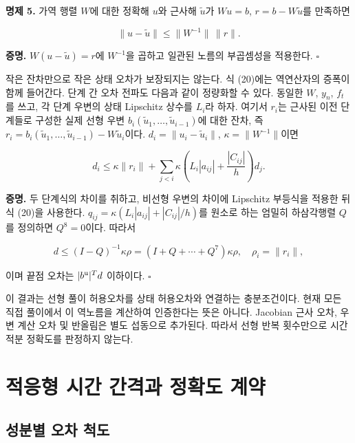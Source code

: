 \documentclass[
  10pt,
  dvipsnames]{article}
\begin{document}
\textbf{명제 5.} 가역 행렬 \(W\)에 대한 정확해 \(u\)와 근사해
\(\widetilde u\)가 \(Wu=b\), \(r=b-W\widetilde u\)를 만족하면

\[
 \|u-\widetilde u\|\le\|W^{-1}\|\,\|r\|.
 \tag{20}
\]

\textbf{증명.} \(W(u-\widetilde u)=r\)에 \(W^{-1}\)을 곱하고 일관된
노름의 부곱셈성을 적용한다. \(\square\)

작은 잔차만으로 작은 상태 오차가 보장되지는 않는다. 식 (20)에는
역연산자의 증폭이 함께 들어간다. 단계 간 오차 전파도 다음과 같이
정량화할 수 있다. 동일한 \(W\), \(y_n\), \(f_t\)를 쓰고, 각 단계 우변의
상태 Lipschitz 상수를 \(L_i\)라 하자. 여기서 \(r_i\)는 근사된 이전
단계들로 구성한 실제 선형 우변
\(b_i(\widetilde u_1,\ldots,\widetilde u_{i-1})\)에 대한 잔차, 즉
\(r_i=b_i(\widetilde u_1,\ldots,\widetilde u_{i-1})-W\widetilde u_i\)이다.
\(d_i=\|u_i-\widetilde u_i\|\), \(\kappa=\|W^{-1}\|\)이면

\[
 d_i\le\kappa\|r_i\|+
 \sum_{j<i}\kappa\left(L_i|a_{ij}|+\frac{|C_{ij}|}{h}\right)d_j.
 \tag{21}
\]

\textbf{증명.} 두 단계식의 차이를 취하고, 비선형 우변의 차이에 Lipschitz
부등식을 적용한 뒤 식 (20)을 사용한다.
\(q_{ij}=\kappa(L_i|a_{ij}|+|C_{ij}|/h)\)를 원소로 하는 엄밀히
하삼각행렬 \(Q\)를 정의하면 \(Q^8=0\)이다. 따라서

\[
 d\le(I-Q)^{-1}\kappa\rho
   =\left(I+Q+\cdots+Q^7\right)\kappa\rho,
 \quad \rho_i=\|r_i\|,
 \tag{22}
\]

이며 끝점 오차는 \(|b^{\rm u}|^Td\) 이하이다. \(\square\)

이 결과는 선형 풀이 허용오차를 상태 허용오차와 연결하는 충분조건이다.
현재 모든 직접 풀이에서 이 역노름을 계산하여 인증한다는 뜻은 아니다.
Jacobian 근사 오차, 우변 계산 오차 및 반올림은 별도 섭동으로 추가된다.
따라서 선형 반복 횟수만으로 시간 적분 정확도를 판정하지 않는다.

\hypertarget{uxc801uxc751uxd615-uxc2dcuxac04-uxac04uxaca9uxacfc-uxc815uxd655uxb3c4-uxacc4uxc57d}{%
\section{적응형 시간 간격과 정확도
계약}\label{uxc801uxc751uxd615-uxc2dcuxac04-uxac04uxaca9uxacfc-uxc815uxd655uxb3c4-uxacc4uxc57d}}

\hypertarget{uxc131uxbd84uxbcc4-uxc624uxcc28-uxcc99uxb3c4}{%
\subsection{성분별 오차
척도}\label{uxc131uxbd84uxbcc4-uxc624uxcc28-uxcc99uxb3c4}}
\end{document}
